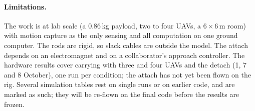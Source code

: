 %

\paragraph{Limitations.} The work is at lab scale (a 0.86\,kg payload, two to four UAVs, a
6\,$\times$\,6\,m room) with motion capture as the only sensing and all computation on one ground
computer. The rods are rigid, so slack cables are outside the model. The attach depends on an
electromagnet and on a collaborator's approach controller. The hardware results cover carrying with
three and four UAVs and the detach (1, 7 and 8 October), one run per condition; the attach has not yet
been flown on the rig.
Several simulation tables rest on single runs or on earlier code,
and are marked as such; they will be re-flown on the final code before the results are frozen.
